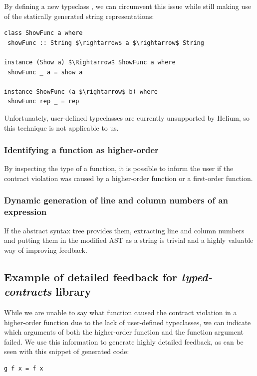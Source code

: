 \documentclass[10pt]{report}
\newcommand{\code}[1]{%
  {%
   \setlength{\fboxsep}{-2\fboxrule}%
   \fcolorbox{black}{light-gray}{\hspace{1.5pt}\strut\texttt{#1}\hspace{1.5pt}}%
  }%
}
\begin{document}
{By defining a new typeclass \code{ShowFunc}, we can circumvent this issue while still making use of the statically generated string representations:

\begin{lstlisting}[mathescape]
class ShowFunc a where
 showFunc :: String $\rightarrow$ a $\rightarrow$ String
 
instance (Show a) $\Rightarrow$ ShowFunc a where
 showFunc _ a = show a
 
instance ShowFunc (a $\rightarrow$ b) where
 showFunc rep _ = rep
\end{lstlisting}

Unfortunately, user-defined typeclasses are currently unsupported by Helium, so this technique is not applicable to us.

\subsubsection{Identifying a function as higher-order}

By inspecting the type of a function, it is possible to inform the user if the contract violation was caused by a higher-order function or a first-order function.

\subsubsection{Dynamic generation of line and column numbers of an expression}

If the abstract syntax tree provides them, extracting line and column numbers and putting them in the modified AST as a string is trivial and a highly valuable way of improving feedback.

\subsection{Example of detailed feedback for \textit{typed-contracts} library}

While we are unable to say what function caused the contract violation in a higher-order function due to the lack of user-defined typeclasses, we can indicate which arguments of both the higher-order function and the function argument failed.
We use this information to generate highly detailed feedback, as can be seen with this snippet of generated code:

\begin{lstlisting}
g f x = f x
\end{lstlisting}

}
\end{document}
